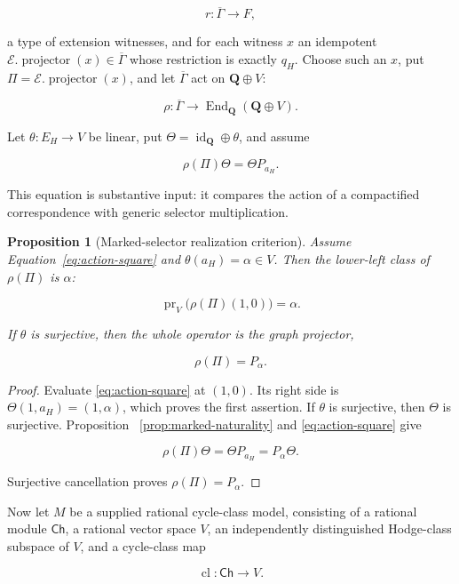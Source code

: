 \documentclass[11pt]{article}
\newtheorem{proposition}[theorem]{Proposition}
\theoremstyle{definition}
\theoremstyle{remark}
\DeclareMathOperator{\End}{End}
\newcommand{\Q}{\mathbf Q}
\newcommand{\Gbar}{\overline{\Gamma}}
\begin{document}
\[
  r:\Gbar\longrightarrow F,
\]

a type of extension witnesses, and for each witness \(x\) an idempotent
\(\mathcal E.\operatorname{projector}(x)\in\Gbar\) whose restriction is
exactly \(q_H\).  Choose such an \(x\), put
\(\Pi=\mathcal E.\operatorname{projector}(x)\), and let \(\Gbar\) act on
\(\Q\oplus V\):

\[
  \rho:\Gbar\longrightarrow
  \End_{\Q}(\Q\oplus V).
\]

Let \(\theta:E_H\to V\) be linear, put
\(\Theta=\operatorname{id}_{\Q}\oplus\theta\), and assume

\begin{equation}
\label{eq:action-square}
  \rho(\Pi)\Theta=\Theta P_{a_H}.
\end{equation}

This equation is substantive input: it compares the action of a compactified
correspondence with generic selector multiplication.

\begin{proposition}[Marked-selector realization criterion]
\label{prop:conditional-realization}
Assume Equation~\eqref{eq:action-square} and
\(\theta(a_H)=\alpha\in V\).  Then the lower-left class of \(\rho(\Pi)\) is
\(\alpha\):

\[
  \operatorname{pr}_V\bigl(\rho(\Pi)(1,0)\bigr)=\alpha.
\]

If \(\theta\) is surjective, then the whole operator is the graph projector,

\[
  \rho(\Pi)=P_\alpha.
\]
\end{proposition}

\begin{proof}
Evaluate \eqref{eq:action-square} at \((1,0)\).  Its right side is
\(\Theta(1,a_H)=(1,\alpha)\), which proves the first assertion.  If \(\theta\)
is surjective, then \(\Theta\) is surjective.  Proposition
~\ref{prop:marked-naturality} and \eqref{eq:action-square} give

\[
  \rho(\Pi)\Theta=\Theta P_{a_H}=P_\alpha\Theta.
\]

Surjective cancellation proves \(\rho(\Pi)=P_\alpha\).
\end{proof}

Now let \(M\) be a supplied rational cycle-class model, consisting of a
rational module \(\mathsf{Ch}\), a rational vector space \(V\), an independently
distinguished Hodge-class subspace of \(V\), and a cycle-class map

\[
  \operatorname{cl}:\mathsf{Ch}\longrightarrow V.
\]
\end{document}
